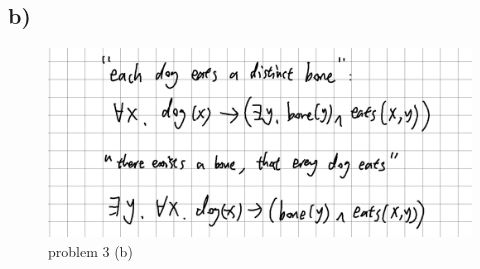 \documentclass[twoside,11pt]{homework}
\begin{document}
\subsection*{b)}
  \begin{figure}[h]
  	\centering
  	\includegraphics[width=0.7\linewidth]{../disambiguation}
  	\caption{problem 3 (b)}
  	\label{fig:02}
  \end{figure}
\end{document}
